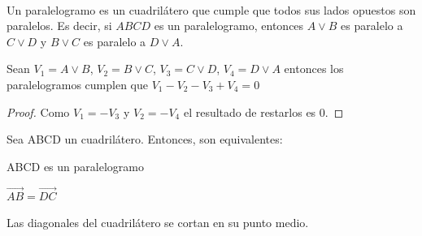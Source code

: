 \begin{ndef}[Paralelogramo]\hfill\\
\begin{minipage}[c]{0.70\textwidth}
  Un paralelogramo es un cuadrilátero que cumple que todos sus lados opuestos son paralelos. Es decir, si $ABCD$ es un
  paralelogramo, entonces $A \vee B$ es paralelo a $C \vee D$ y $B \vee C$ es paralelo a $D \vee A$.
\end{minipage}\hfill
\begin{minipage}[]{0.27\textwidth}
  \sffamily
\end{minipage}
\end{ndef}

\hfill


\begin{nprop}
	Sean $V_{1} = A \vee B$, $V_{2} = B \vee C$, $V_{3} = C\vee D$, $V_{4} = D \vee A$ entonces los paralelogramos cumplen que $V_{1} - V_{2} - V_{3} + V_{4} = 0$

\end{nprop}

\begin{proof} \hfill

		 Como $V_1 = -V_3$ y $V_2 =-V_4$ el resultado de restarlos es $0$.
\end{proof}


\begin{nprop}
  Sea ABCD un cuadrilátero. Entonces, son equivalentes:
  \begin{nlist}
  \item ABCD es un paralelogramo
  \item $\vec{AB} = \vec{DC}$
  \item Las diagonales del cuadrilátero se cortan en su punto medio.
  \end{nlist}
\end{nprop}


